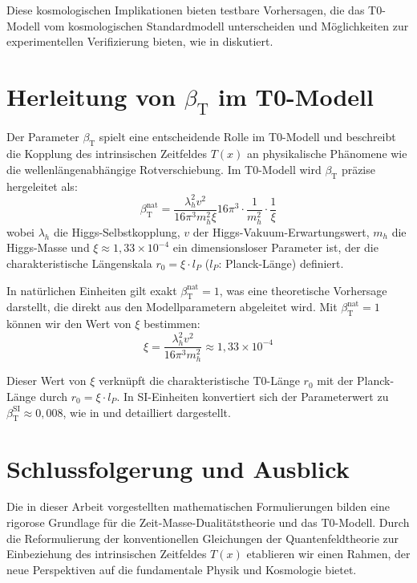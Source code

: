 \documentclass[12pt,a4paper]{article}
\newcommand{\Tfield}{T(x)}
\newcommand{\betaT}{\beta_{\text{T}}}
\theoremstyle{definition}
\theoremstyle{remark}
\begin{document}
	Diese kosmologischen Implikationen bieten testbare Vorhersagen, die das T0-Modell vom kosmologischen Standardmodell unterscheiden und Möglichkeiten zur experimentellen Verifizierung bieten, wie in \cite{pascher_messdifferenzen_2025} diskutiert.
	
	\section{Herleitung von \(\betaT\) im T0-Modell}
	Der Parameter \(\betaT\) spielt eine entscheidende Rolle im T0-Modell und beschreibt die Kopplung des intrinsischen Zeitfeldes \(\Tfield\) an physikalische Phänomene wie die wellenlängenabhängige Rotverschiebung. Im T0-Modell wird \(\betaT\) präzise hergeleitet als:
	\begin{equation}
		\betaT^{\text{nat}} = \frac{\lambda_h^2 v^2}{16\pi^3 m_h^2 \xi}{16\pi^3} \cdot \frac{1}{m_h^2} \cdot \frac{1}{\xi}
	\end{equation}
	wobei \(\lambda_h\) die Higgs-Selbstkopplung, \(v\) der Higgs-Vakuum-Erwartungswert, \(m_h\) die Higgs-Masse und \(\xi \approx 1,33 \times 10^{-4}\) ein dimensionsloser Parameter ist, der die charakteristische Längenskala \(r_0 = \xi \cdot l_P\) (\(l_P\): Planck-Länge) definiert.
	
	In natürlichen Einheiten gilt exakt \(\betaT^{\text{nat}} = 1\), was eine theoretische Vorhersage darstellt, die direkt aus den Modellparametern abgeleitet wird. Mit \(\betaT^{\text{nat}} = 1\) können wir den Wert von \(\xi\) bestimmen:
	\begin{equation}
		\xi = \frac{\lambda_h^2 v^2}{16\pi^3 m_h^2} \approx 1,33 \times 10^{-4}
	\end{equation}
	
	Dieser Wert von \(\xi\) verknüpft die charakteristische T0-Länge \(r_0\) mit der Planck-Länge durch \(r_0 = \xi \cdot l_P\). In SI-Einheiten konvertiert sich der Parameterwert zu \(\betaT^{\text{SI}} \approx 0,008\), wie in \cite{pascher_alphabeta_2025} und \cite{pascher_params_2025} detailliert dargestellt.
	
	\section{Schlussfolgerung und Ausblick}
	Die in dieser Arbeit vorgestellten mathematischen Formulierungen bilden eine rigorose Grundlage für die Zeit-Masse-Dualitätstheorie und das T0-Modell. Durch die Reformulierung der konventionellen Gleichungen der Quantenfeldtheorie zur Einbeziehung des intrinsischen Zeitfeldes \(\Tfield\) etablieren wir einen Rahmen, der neue Perspektiven auf die fundamentale Physik und Kosmologie bietet.
	
\end{document}
